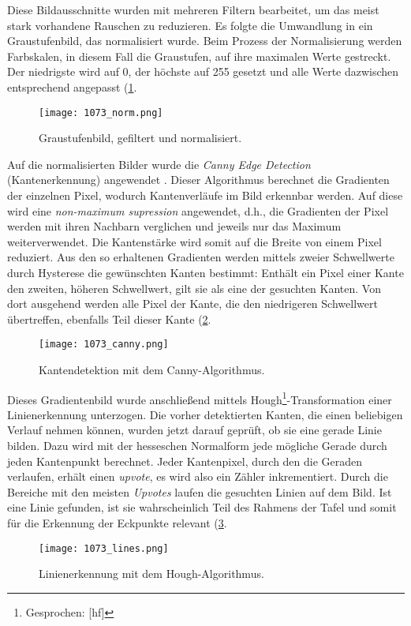 Diese Bildausschnitte wurden mit mehreren Filtern bearbeitet, um das meist stark vorhandene Rauschen zu reduzieren. Es folgte die Umwandlung in ein Graustufenbild, das normalisiert wurde. Beim Prozess der Normalisierung werden Farbskalen, in diesem Fall die Graustufen, auf ihre maximalen Werte gestreckt. Der niedrigste wird auf 0, der höchste auf 255 gesetzt und alle Werte dazwischen entsprechend angepasst (\ref{fig:norm}.

\begin{figure}[h!]
\centering
\texttt{[image: 1073\_norm.png]}
\caption{Graustufenbild, gefiltert und normalisiert.}
\label{fig:norm}
\end{figure}

Auf die normalisierten Bilder wurde die \textit{Canny Edge Detection} (Kantenerkennung) angewendet \cite{cannyedge}. Dieser Algorithmus berechnet die Gradienten der einzelnen Pixel, wodurch Kantenverläufe im Bild erkennbar werden. Auf diese wird eine \textit{non-maximum supression} angewendet, d.h., die Gradienten der Pixel werden mit ihren Nachbarn verglichen und jeweils nur das Maximum weiterverwendet. Die Kantenstärke wird somit auf die Breite von einem Pixel reduziert. Aus den so erhaltenen Gradienten werden mittels zweier Schwellwerte durch Hysterese die gewünschten Kanten bestimmt: Enthält ein Pixel einer Kante den zweiten, höheren Schwellwert, gilt sie als eine der gesuchten Kanten. Von dort ausgehend werden alle Pixel der Kante, die den niedrigeren Schwellwert übertreffen, ebenfalls Teil dieser Kante (\ref{fig:canny}.
\begin{figure}[h!]
\centering
\texttt{[image: 1073\_canny.png]}
\caption{Kantendetektion mit dem Canny-Algorithmus.}
\label{fig:canny}
\end{figure}

Dieses Gradientenbild wurde anschließend mittels Hough\footnote{Gesprochen: [h\textturnv{}f]}-Transformation \cite{houghpatent} einer Linienerkennung unterzogen. Die vorher detektierten Kanten, die einen beliebigen Verlauf nehmen können, wurden jetzt darauf geprüft, ob sie eine gerade Linie bilden. Dazu wird mit der hesseschen Normalform jede mögliche Gerade durch jeden Kantenpunkt berechnet. Jeder Kantenpixel, durch den die Geraden verlaufen, erhält einen \textit{upvote}, es wird also ein Zähler inkrementiert. Durch die Bereiche mit den meisten \textit{Upvotes} laufen die gesuchten Linien auf dem Bild. Ist eine Linie gefunden, ist sie wahrscheinlich Teil des Rahmens der Tafel und somit für die Erkennung der Eckpunkte relevant (\ref{fig:lines}.
\begin{figure}[h!]
\centering
\texttt{[image: 1073\_lines.png]}
\caption{Linienerkennung mit dem Hough-Algorithmus.}
\label{fig:lines}
\end{figure}

